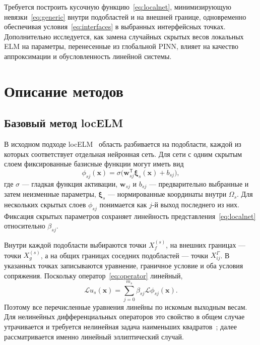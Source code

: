 \documentclass{misisarticle}
\begin{document}
Требуется построить кусочную функцию~\eqref{eq:localnet}, минимизирующую невязки~\eqref{eq:generic} внутри подобластей и на внешней границе, одновременно обеспечивая условия~\eqref{eq:interfaces} в выбранных интерфейсных точках. Дополнительно исследуется, как замена случайных скрытых весов локальных ELM на параметры, перенесенные из глобальной PINN, влияет на качество аппроксимации и обусловленность линейной системы.

\section{Описание методов}

\subsection{Базовый метод locELM}

В исходном подходе locELM~\cite{dongli2021} область разбивается на подобласти, каждой из которых соответствует отдельная нейронная сеть. Для сети с одним скрытым слоем фиксированные базисные функции могут иметь вид
\begin{equation}
 \phi_{sj}(\mathbf{x})=
 \sigma\bigl(\mathbf w_{sj}^{\mathsf T}
 \boldsymbol\xi_s(\mathbf{x})+b_{sj}\bigr),
\label{eq:features}
\end{equation}
где $\sigma$ --- гладкая функция активации, $\mathbf w_{sj}$ и $b_{sj}$ --- предварительно выбранные и затем неизменные параметры, $\boldsymbol\xi_s$ --- нормированные координаты внутри $\Omega_s$. Для нескольких скрытых слоев $\phi_{sj}$ понимается как $j$-й выход последнего из них. Фиксация скрытых параметров сохраняет линейность представления~\eqref{eq:localnet} относительно $\beta_{sj}$.

Внутри каждой подобласти выбираются точки $X_f^{(s)}$, на внешних границах --- точки $X_g^{(s)}$, а на общих границах соседних подобластей --- точки $X_{ij}^{\Gamma}$. В указанных точках записываются уравнение, граничное условие и оба условия сопряжения. Поскольку оператор~\eqref{eq:operator} линейный,
\begin{equation}
 \mathcal{L}u_s(\mathbf{x})=
 \sum_{j=0}^{m_s}\beta_{sj}
 \mathcal{L}\phi_{sj}(\mathbf{x}).
\label{eq:linearoperator}
\end{equation}
Поэтому все перечисленные уравнения линейны по искомым выходным весам. Для нелинейных дифференциальных операторов это свойство в общем случае утрачивается и требуется нелинейная задача наименьших квадратов~\cite{dongli2021}; далее рассматривается именно линейный эллиптический случай.
\end{document}
